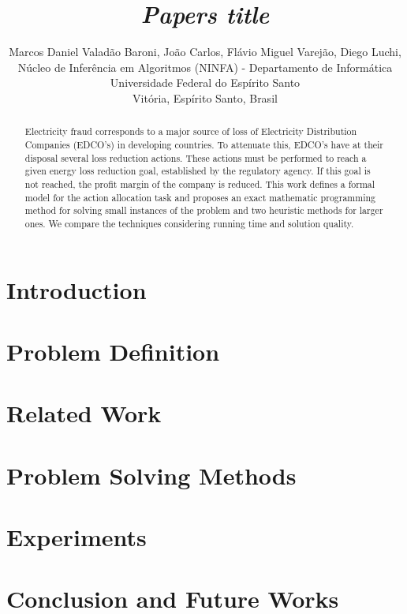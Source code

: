 \documentclass{llncs}
\title{\it Papers title}
\author{
Marcos Daniel Valad\~ao Baroni,
Jo\~ao Carlos,
Fl\'avio Miguel Varej\~ao,
Diego Luchi,\\
N\'ucleo de Infer\^encia em Algoritmos (NINFA) - Departamento de Inform\'atica\\
Universidade Federal do Esp\'irito Santo\\
Vit\'oria, Esp\'irito Santo, Brasil
}
\begin{document}
\maketitle

\begin{abstract}
Electricity fraud corresponds to a major source of loss of Electricity
Distribution Companies (EDCO's) in developing countries. To attenuate this,
EDCO's have at their disposal several loss reduction actions. These actions
must be performed to reach a given energy loss reduction goal, established
by the regulatory agency. If this goal is not reached, the profit margin
of the company is reduced.
This work defines a formal model for the action allocation task 
and proposes an exact mathematic programming method for solving small instances of
the problem and two heuristic methods for larger ones. We compare
the techniques considering running time and solution quality.
\end{abstract}

\section{Introduction}
\label{sec:introduction}


\section{Problem Definition}
\label{sec:definition}


\section{Related Work}
\label{sec:related}


\section{Problem Solving Methods}
\label{sec:solving}


\section{Experiments}
\label{sec:experiments}


\section{Conclusion and Future Works}
\label{sec:conclusion}

\end{document}
